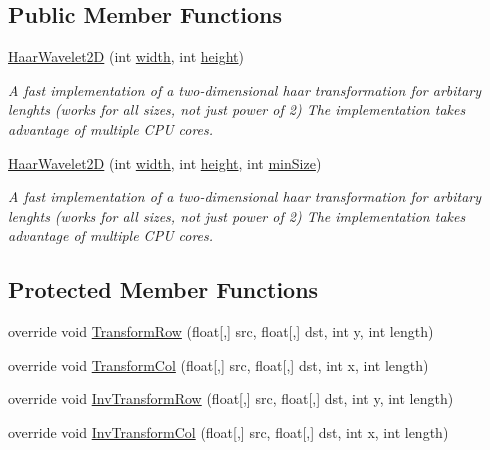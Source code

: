 \subsection*{\-Public \-Member \-Functions}
\begin{DoxyCompactItemize}
\item 
\hyperlink{class_turbo_wavelets_1_1_haar_wavelet2_d_ab55a20658fe1f22b6e756418b4e1dc29}{\-Haar\-Wavelet2\-D} (int \hyperlink{class_turbo_wavelets_1_1_wavelet2_d_aaa4b3711957fe1798980e6891331a08d}{width}, int \hyperlink{class_turbo_wavelets_1_1_wavelet2_d_afb2aa87b89b82f329357cbdc0cde18a8}{height})
\begin{DoxyCompactList}\small\item\em \-A fast implementation of a two-\/dimensional haar transformation for arbitary lenghts (works for all sizes, not just power of 2) \-The implementation takes advantage of multiple \-C\-P\-U cores. \end{DoxyCompactList}\item 
\hyperlink{class_turbo_wavelets_1_1_haar_wavelet2_d_a8064166eec2c0a4b66378896b882bd47}{\-Haar\-Wavelet2\-D} (int \hyperlink{class_turbo_wavelets_1_1_wavelet2_d_aaa4b3711957fe1798980e6891331a08d}{width}, int \hyperlink{class_turbo_wavelets_1_1_wavelet2_d_afb2aa87b89b82f329357cbdc0cde18a8}{height}, int \hyperlink{class_turbo_wavelets_1_1_wavelet2_d_af5148ef1a46dd5694ccea13aa8f1b9e2}{min\-Size})
\begin{DoxyCompactList}\small\item\em \-A fast implementation of a two-\/dimensional haar transformation for arbitary lenghts (works for all sizes, not just power of 2) \-The implementation takes advantage of multiple \-C\-P\-U cores. \end{DoxyCompactList}\end{DoxyCompactItemize}
\subsection*{\-Protected \-Member \-Functions}
\begin{DoxyCompactItemize}
\item 
override void \hyperlink{class_turbo_wavelets_1_1_haar_wavelet2_d_a55f6abb99bf5d87017e715b63f64cc15}{\-Transform\-Row} (float\mbox{[},\mbox{]} src, float\mbox{[},\mbox{]} dst, int y, int length)
\item 
override void \hyperlink{class_turbo_wavelets_1_1_haar_wavelet2_d_a5695f7a35bbbae2f64d5c92212cd1f83}{\-Transform\-Col} (float\mbox{[},\mbox{]} src, float\mbox{[},\mbox{]} dst, int x, int length)
\item 
override void \hyperlink{class_turbo_wavelets_1_1_haar_wavelet2_d_a870ff202a886a34c54013b867e56f6e6}{\-Inv\-Transform\-Row} (float\mbox{[},\mbox{]} src, float\mbox{[},\mbox{]} dst, int y, int length)
\item 
override void \hyperlink{class_turbo_wavelets_1_1_haar_wavelet2_d_a780d0ea14dea6a587c8ebf21f19670d0}{\-Inv\-Transform\-Col} (float\mbox{[},\mbox{]} src, float\mbox{[},\mbox{]} dst, int x, int length)
\end{DoxyCompactItemize}
